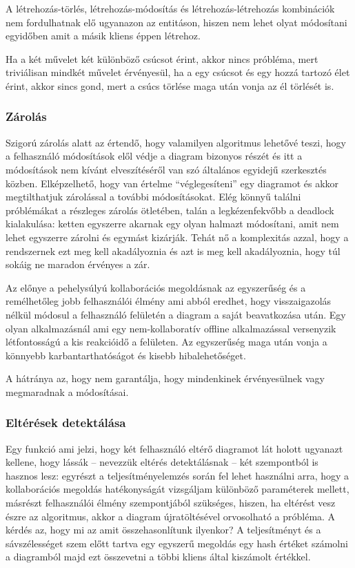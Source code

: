 A létrehozás-törlés, létrehozás-módosítás és létrehozás-létrehozás kombinációk nem fordulhatnak elő ugyanazon az entitáson, hiszen nem lehet olyat módosítani egyidőben amit a másik kliens éppen létrehoz.

Ha a két művelet két különböző csúcsot érint, akkor nincs próbléma, mert triviálisan mindkét művelet érvényesül, ha a egy csúcsot és egy hozzá tartozó élet érint, akkor sincs gond, mert a csúcs törlése maga után vonja az él törlését is. 

\subsubsection{Zárolás}

Szigorú zárolás alatt az értendő, hogy valamilyen algoritmus lehetővé teszi, hogy a felhasználó módosítások elől védje a diagram bizonyos részét és itt a módosítások nem kívánt elveszítéséről van szó általános egyidejű szerkesztés közben. Elképzelhető, hogy van értelme ``véglegesíteni'' egy diagramot és akkor megtilthatjuk zárolással a további módosításokat. Elég könnyű találni próblémákat a részleges zárolás ötletében, talán a legkézenfekvőbb a deadlock kialakulása: ketten egyszerre akarnak egy olyan halmazt módosítani, amit nem lehet egyszerre zárolni és egymást kizárják. Tehát nő a komplexitás azzal, hogy a rendszernek ezt meg kell akadályoznia és azt is meg kell akadályoznia, hogy túl sokáig ne maradon érvényes a zár.  

Az előnye a pehelysúlyú kollaborációs megoldásnak az egyszerűség és a remélhetőleg jobb felhasználói élmény ami abból eredhet, hogy visszaigazolás nélkül módosul a felhasználó felületén a diagram a saját beavatkozása után. Egy olyan alkalmazásnál ami egy nem-kollaboratív offline alkalmazással versenyzik létfontosságú a kis reakcióidő a felületen. Az egyszerűség maga után vonja a könnyebb karbantarthatóságot és kisebb hibalehetőséget.   

A hátránya az, hogy nem garantálja, hogy mindenkinek érvényesülnek vagy megmaradnak a módosításai.

\subsubsection{Eltérések detektálása}

Egy funkció ami jelzi, hogy két felhasználó eltérő diagramot lát holott ugyanazt kellene, hogy lássák -- nevezzük eltérés detektálásnak -- két szempontból is hasznos lesz: egyrészt a teljesítményelemzés során fel lehet használni arra, hogy a kollaborációs megoldás hatékonyságát vizsgáljam különböző paraméterek mellett, másrészt felhasználói élmény szempontjából szükséges, hiszen, ha eltérést vesz észre az algoritmus, akkor a diagram újratöltésével orvosolható a próbléma. 
A kérdés az, hogy mi az amit összehasonlítunk ilyenkor? A teljesítményt és a sávszélességet szem előtt tartva egy egyszerű megoldás egy hash értéket számolni a diagramból majd ezt összevetni a többi kliens által kiszámolt értékkel.

